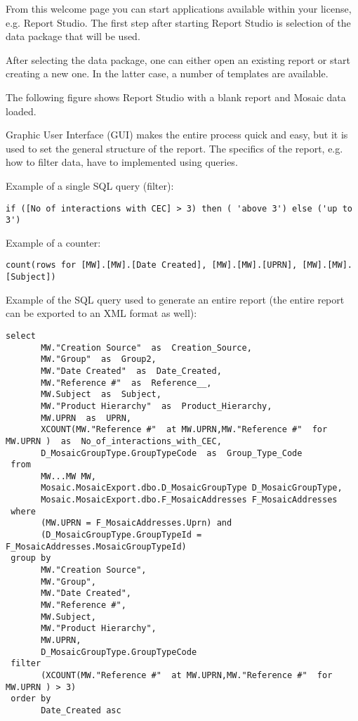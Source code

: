 From this welcome page you can start applications available within your license, e.g. Report Studio. The first step after starting Report Studio is selection of the data package that will be used.


After selecting the data package, one can either open an existing report or start creating a new one. In the latter case, a number of templates are available.


The following figure shows Report Studio with a blank report and Mosaic data loaded.


Graphic User Interface (GUI) makes the entire process quick and easy, but it is used to set the general structure of the report. The specifics of the report, e.g. how to filter data, have to implemented using queries.

Example of a single SQL query (filter):
\begin{lstlisting}
if ([No of interactions with CEC] > 3) then ( 'above 3') else ('up to 3')
\end{lstlisting}
Example of a counter:
\begin{lstlisting}
count(rows for [MW].[MW].[Date Created], [MW].[MW].[UPRN], [MW].[MW].[Subject])
\end{lstlisting}
Example of the SQL query used to generate an entire report (the entire report can be exported to an XML format as well):
\begin{lstlisting}
select 
       MW."Creation Source"  as  Creation_Source,
       MW."Group"  as  Group2,
       MW."Date Created"  as  Date_Created,
       MW."Reference #"  as  Reference__,
       MW.Subject  as  Subject,
       MW."Product Hierarchy"  as  Product_Hierarchy,
       MW.UPRN  as  UPRN,
       XCOUNT(MW."Reference #"  at MW.UPRN,MW."Reference #"  for MW.UPRN )  as  No_of_interactions_with_CEC,
       D_MosaicGroupType.GroupTypeCode  as  Group_Type_Code
 from 
       MW...MW MW,
       Mosaic.MosaicExport.dbo.D_MosaicGroupType D_MosaicGroupType,
       Mosaic.MosaicExport.dbo.F_MosaicAddresses F_MosaicAddresses
 where 
       (MW.UPRN = F_MosaicAddresses.Uprn) and 
       (D_MosaicGroupType.GroupTypeId = F_MosaicAddresses.MosaicGroupTypeId)
 group by 
       MW."Creation Source",
       MW."Group",
       MW."Date Created",
       MW."Reference #",
       MW.Subject,
       MW."Product Hierarchy",
       MW.UPRN,
       D_MosaicGroupType.GroupTypeCode
 filter 
       (XCOUNT(MW."Reference #"  at MW.UPRN,MW."Reference #"  for MW.UPRN ) > 3)
 order by 
       Date_Created asc
\end{lstlisting}

